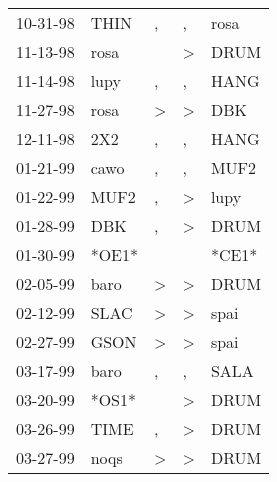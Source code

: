 \begin{supertabular}{p{0.07\textwidth}p{0.06\textwidth}p{0.02\textwidth}p{0.02\textwidth}p{0.06\textwidth}}
 10-31-98\textsuperscript{} &           THIN\textsuperscript{} &             , &             , &  rosa\textsuperscript{} \\
 11-13-98\textsuperscript{} &           rosa\textsuperscript{} &               &  \textgreater &  DRUM\textsuperscript{} \\
 11-14-98\textsuperscript{} &           lupy\textsuperscript{} &             , &             , &  HANG\textsuperscript{} \\
 11-27-98\textsuperscript{} &           rosa\textsuperscript{} &  \textgreater &  \textgreater &   DBK\textsuperscript{} \\
 12-11-98\textsuperscript{} &            2X2\textsuperscript{} &             , &             , &  HANG\textsuperscript{} \\
 01-21-99\textsuperscript{} &           cawo\textsuperscript{} &             , &             , &  MUF2\textsuperscript{} \\
 01-22-99\textsuperscript{} &           MUF2\textsuperscript{} &             , &  \textgreater &  lupy\textsuperscript{} \\
 01-28-99\textsuperscript{} &            DBK\textsuperscript{} &             , &  \textgreater &  DRUM\textsuperscript{} \\
 01-30-99\textsuperscript{} &                            *OE1* &               &               &                   *CE1* \\
 02-05-99\textsuperscript{} &           baro\textsuperscript{} &  \textgreater &  \textgreater &  DRUM\textsuperscript{} \\
 02-12-99\textsuperscript{} &           SLAC\textsuperscript{} &  \textgreater &  \textgreater &  spai\textsuperscript{} \\
 02-27-99\textsuperscript{} &           GSON\textsuperscript{} &  \textgreater &  \textgreater &  spai\textsuperscript{} \\
 03-17-99\textsuperscript{} &           baro\textsuperscript{} &             , &             , &  SALA\textsuperscript{} \\
 03-20-99\textsuperscript{} &                            *OS1* &               &  \textgreater &  DRUM\textsuperscript{} \\
 03-26-99\textsuperscript{} &           TIME\textsuperscript{} &             , &  \textgreater &  DRUM\textsuperscript{} \\
 03-27-99\textsuperscript{} &           noqs\textsuperscript{} &  \textgreater &  \textgreater &  DRUM\textsuperscript{} \\

\end{supertabular}
